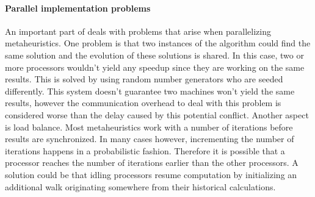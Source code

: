 \documentclass{IEEEconf}
\begin{document}
\paragraph{Parallel implementation problems}
An important part of \cite{Alba05} deals with problems that arise when parallelizing metaheuristics. One problem is that two instances of the algorithm could find the same solution and the evolution of these solutions is shared. In this case, two or more processors wouldn't yield any speedup since they are working on the same results. This is solved by using random number generators who are seeded differently. This system doesn't guarantee two machines won't yield the same results, however the communication overhead to deal with this problem is considered worse than the delay caused by this potential conflict. Another aspect is load balance. Most metaheuristics work with a number of iterations before results are synchronized. In many cases however, incrementing the number of iterations happens in a probabilistic fashion. Therefore it is possible that a processor reaches the number of iterations earlier than the other processors. A solution could be that idling processors resume computation by initializing an additional walk originating somewhere from their historical calculations.
\end{document}
